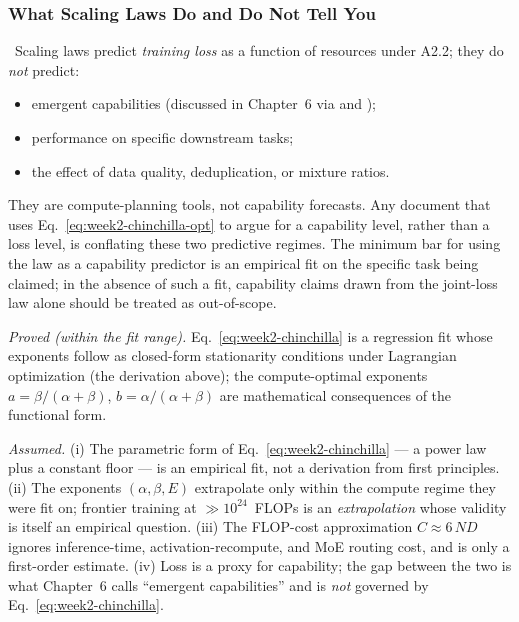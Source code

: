 \subsubsection{What Scaling Laws Do and Do Not Tell You}

\Norm\ Scaling laws predict \emph{training loss} as a function of
resources under A2.2; they do \emph{not} predict:
\begin{itemize}
  \item emergent capabilities (discussed in Chapter~6 via
        \citet{wei2022emergent} and \citet{schaeffer2023mirage});
  \item performance on specific downstream tasks;
  \item the effect of data quality, deduplication, or mixture ratios.
\end{itemize}
They are compute-planning tools, not capability forecasts. Any
document that uses Eq.~\eqref{eq:week2-chinchilla-opt} to argue for a
capability level, rather than a loss level, is conflating these two
predictive regimes. The minimum bar for using the law as a capability
predictor is an empirical fit on the specific task being claimed; in
the absence of such a fit, capability claims drawn from the joint-loss
law alone should be treated as out-of-scope.

\begin{provedassumed}
\emph{Proved (within the fit range).}
Eq.~\eqref{eq:week2-chinchilla} is a regression fit whose exponents
follow as closed-form stationarity conditions under Lagrangian
optimization (the derivation above); the compute-optimal exponents
$a = \beta/(\alpha+\beta)$, $b = \alpha/(\alpha+\beta)$ are
mathematical consequences of the functional form.

\emph{Assumed.}
(i) The parametric form of Eq.~\eqref{eq:week2-chinchilla} — a power
law plus a constant floor — is an empirical fit, not a derivation
from first principles.
(ii) The exponents $(\alpha, \beta, E)$ extrapolate only within the
compute regime they were fit on; frontier training at
$\gg 10^{24}$~FLOPs is an \emph{extrapolation} whose validity is
itself an empirical question.
(iii) The FLOP-cost approximation $C \approx 6\,N D$ ignores
inference-time, activation-recompute, and MoE routing cost, and is
only a first-order estimate.
(iv) Loss is a proxy for capability; the gap between the two is
what Chapter~6 calls ``emergent capabilities'' and is \emph{not}
governed by Eq.~\eqref{eq:week2-chinchilla}.
\end{provedassumed}

